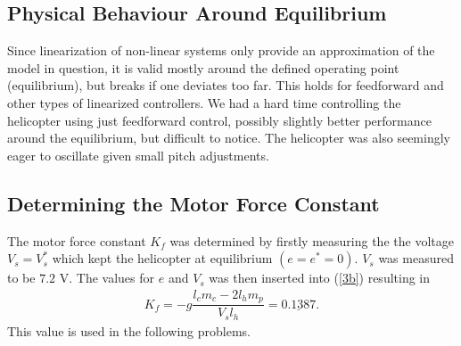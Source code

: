\subsection{Physical Behaviour Around Equilibrium}

Since linearization of non-linear systems only provide an approximation of the model in question, it is valid mostly around the defined operating point (equilibrium), but breaks if one deviates too far. This holds for feedforward and other types of linearized controllers. We had a hard time controlling the helicopter using just feedforward control, possibly slightly better performance around the equilibrium, but difficult to notice. The helicopter was also seemingly eager to oscillate given small pitch adjustments. 


\subsection{Determining the Motor Force Constant}
The motor force constant $K_f$ was determined by firstly measuring the the voltage $V_s = V_s^*$ which kept the helicopter at equilibrium $(e = e^* = 0)$. $V_s$ was measured to be $7.2 $ V. The values for $e$ and $V_s$ was then inserted into (\ref{3b}) resulting in 
%
\begin{align*}
    K_f = -g\dfrac{l_cm_c-2l_hm_p}{V_sl_h} = \underline{0.1387}.
\end{align*}
%
This value is used in the following problems.

